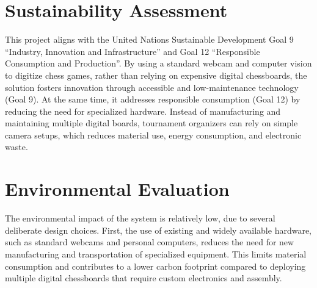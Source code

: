 

\section{Sustainability Assessment}
This project aligns with the United Nations Sustainable Development Goal 9 “Industry, Innovation and Infrastructure” and Goal 12 “Responsible Consumption and Production”. By using a standard webcam and computer vision to digitize chess games, rather than relying on expensive digital chessboards, the solution fosters innovation through accessible and low-maintenance technology (Goal 9). At the same time, it addresses responsible consumption (Goal 12) by reducing the need for specialized hardware. Instead of manufacturing and maintaining multiple digital boards, tournament organizers can rely on simple camera setups, which reduces material use, energy consumption, and electronic waste.

\section{Environmental Evaluation}
The environmental impact of the system is relatively low, due to several deliberate design choices. First, the use of existing and widely available hardware, such as standard webcams and personal computers, reduces the need for new manufacturing and transportation of specialized equipment. This limits material consumption and contributes to a lower carbon footprint compared to deploying multiple digital chessboards that require custom electronics and assembly. \\

